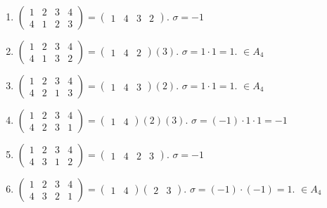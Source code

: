 \documentclass[11pt, a4paper]{article} %
\begin{document}
\begin{enumerate}
    \item $\begin{pmatrix}
        1 &2 &3 &4\\
        4 &1 &2 &3
    \end{pmatrix} = \begin{pmatrix}1 &4 &3 &2\end{pmatrix}$.
    $\sigma = -1$

    \item $\begin{pmatrix}
        1 &2 &3 &4\\
        4 &1 &3 &2
    \end{pmatrix} = \begin{pmatrix}1 &4 &2\end{pmatrix}(3)$.
    $\sigma = 1 \cdot 1 = 1$. $\in A_4$

    \item $\begin{pmatrix}
        1 &2 &3 &4\\
        4 &2 &1 &3
    \end{pmatrix} = \begin{pmatrix}1 &4 &3\end{pmatrix}(2)$.
    $\sigma = 1 \cdot 1 = 1$. $\in A_4$

    \item $\begin{pmatrix}
        1 &2 &3 &4\\
        4 &2 &3 &1
    \end{pmatrix} = \begin{pmatrix}1 &4\end{pmatrix}(2)(3)$.
    $\sigma = (-1) \cdot 1 \cdot 1 = -1$

    \item $\begin{pmatrix}
        1 &2 &3 &4\\
        4 &3 &1 &2
    \end{pmatrix} = \begin{pmatrix}1 &4 &2 &3\end{pmatrix}$.
    $\sigma = -1$

    \item $\begin{pmatrix}
        1 &2 &3 &4\\
        4 &3 &2 &1
    \end{pmatrix} = \begin{pmatrix}1 &4\end{pmatrix}\begin{pmatrix}2 &3\end{pmatrix}$.
    $\sigma = (-1) \cdot (-1) = 1$. $\in A_4$
\end{enumerate}
\end{document}
